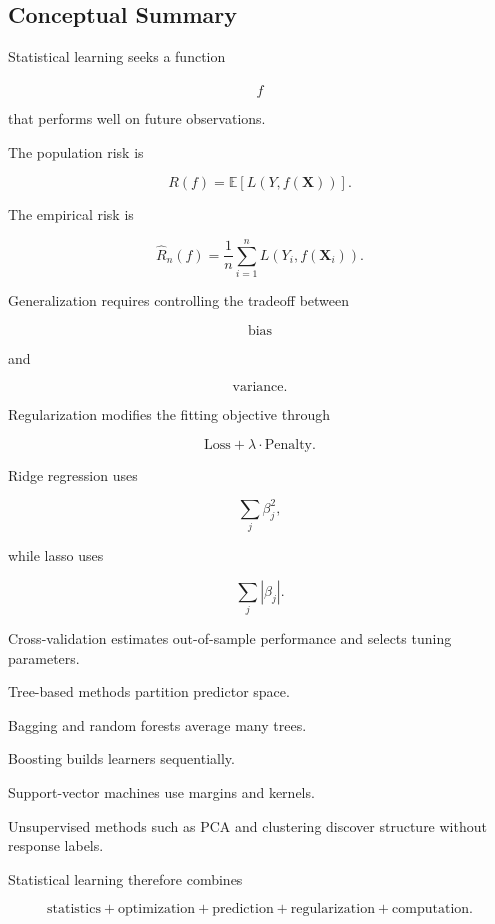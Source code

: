\subsection{Conceptual Summary}
\label{subsec:statistical-learning-summary}

Statistical learning seeks a function

\[
\boxed{
\widehat{f}
}
\]

that performs well on future observations.

The population risk is

\[
\boxed{
R(f)
=
\mathbb{E}
[
L
(
Y,f(\mathbf{X})
)
].
}
\]

The empirical risk is

\[
\boxed{
\widehat{R}_n(f)
=
\frac1n
\sum_{i=1}^{n}
L
(
Y_i,f(\mathbf{X}_i)
).
}
\]

Generalization requires controlling the tradeoff between

\[
\boxed{
\text{bias}
}
\]

and

\[
\boxed{
\text{variance}.
}
\]

Regularization modifies the fitting objective through

\[
\boxed{
\text{Loss}
+
\lambda
\cdot
\text{Penalty}.
}
\]

Ridge regression uses

\[
\boxed{
\sum_j\beta_j^2,
}
\]

while lasso uses

\[
\boxed{
\sum_j|\beta_j|.
}
\]

Cross-validation estimates out-of-sample performance and selects tuning
parameters.

Tree-based methods partition predictor space.

Bagging and random forests average many trees.

Boosting builds learners sequentially.

Support-vector machines use margins and kernels.

Unsupervised methods such as PCA and clustering discover structure
without response labels.

Statistical learning therefore combines

\[
\boxed{
\text{statistics}
+
\text{optimization}
+
\text{prediction}
+
\text{regularization}
+
\text{computation}.
}
\]

